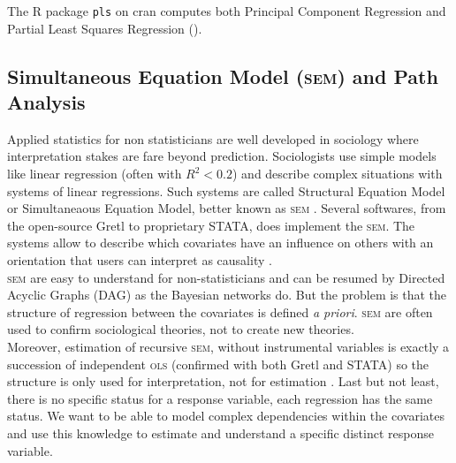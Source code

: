 \documentclass[12pt,a4paper]{report}
\begin{document}
%	
%	
	
	The R package {\tt pls} on {\sc cran} computes both Principal Component Regression and Partial Least Squares Regression (\cite{packagepls}).
		\subsection{Simultaneous Equation Model (\textsc{sem}) and Path Analysis}		%
		Applied statistics  for non statisticians are well developed in sociology where interpretation  stakes are fare beyond prediction. Sociologists use simple models like linear regression (often with $R^2<0.2$) and describe complex situations with systems of linear regressions. Such systems are called Structural Equation Model or Simultaneaous Equation Model, better known as \textsc{sem} \cite{davidson1993estimation}. Several softwares, from the open-source Gretl \cite{CottrellLucchetti2007gretlmanual} to proprietary STATA, does implement the \textsc{sem}. The systems allow to describe which covariates have an influence on others with an orientation that users can interpret as causality \cite{pearl2000causality,pearl1998graphs}. \\
		
		\textsc{sem} are easy to understand for non-statisticians and can be resumed by Directed Acyclic Graphs (DAG) as the Bayesian networks do. But the problem is that the structure of regression between the covariates is defined {\it a priori}. \textsc{sem} are often used to confirm sociological theories, not to create new theories. \\
		
		Moreover, estimation of recursive \textsc{sem}, without instrumental variables is exactly a succession of independent \textsc{ols} (confirmed with both Gretl and STATA) so the structure is only used for interpretation, not for estimation \cite{brito2006graphical}. Last but not least, there is no specific status for a response variable, each regression has the same status. We want to be able to model complex dependencies within the covariates and use this knowledge to estimate and understand a specific distinct response variable.
\end{document}
